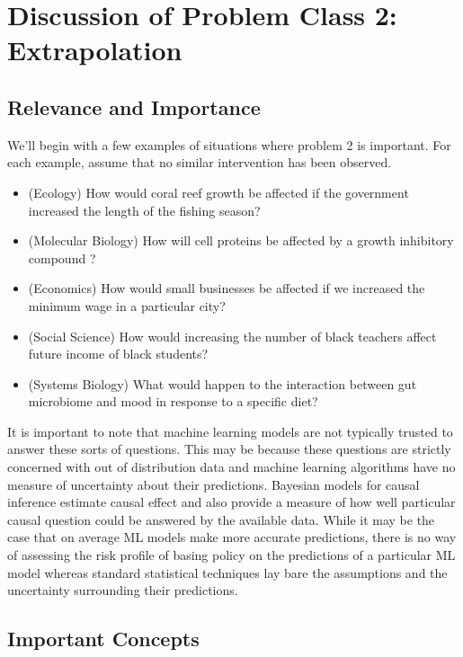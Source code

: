 \documentclass{article}
\begin{document}
\section*{Discussion of Problem Class 2: Extrapolation}

    \subsection*{Relevance and Importance}

        We'll begin with a few examples of situations where problem 2 is important. For each example, assume that no
        similar intervention has been observed.

        \begin{itemize}
            \item (Ecology) How would coral reef growth be affected if the government increased the length of the fishing season?
            \item (Molecular Biology) How will cell proteins be affected by a growth inhibitory compound \cite{dibernardo2005chemogenomic}? 
            \item (Economics) How would small businesses be affected if we increased the minimum wage in a particular city?
            \item (Social Science) How would increasing the number of black teachers affect future income of black students?
            \item (Systems Biology) What would happen to the interaction between gut microbiome and mood in response to a specific diet?
        \end{itemize}

        It is important to note that machine learning models are not typically trusted to answer these sorts of questions.
        This may be because these questions are strictly concerned with out of distribution data and machine learning
        algorithms have no measure of uncertainty about their predictions. Bayesian models for causal inference estimate
        causal effect and also provide a measure of how well particular causal question could be answered
        by the available data. While it may be the case that on average ML models make more accurate predictions, there is no way of 
        assessing the risk profile of basing policy on the predictions of a particular ML model whereas standard
        statistical techniques lay bare the assumptions and the uncertainty surrounding their predictions.


    \subsection*{Important Concepts}
\end{document}

